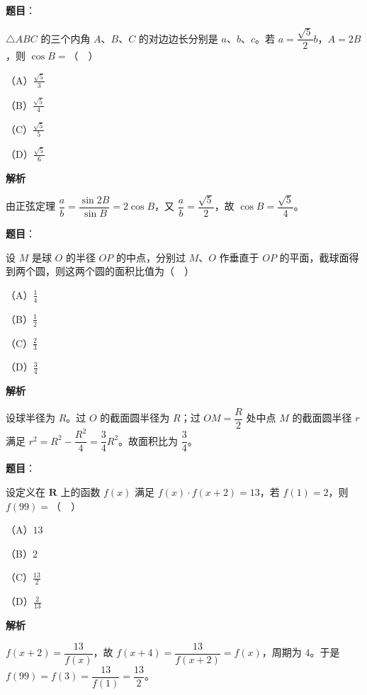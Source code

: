 \begin{answer}

\textbf{题目}：

$\triangle ABC$ 的三个内角 $A$、$B$、$C$ 的对边边长分别是 $a$、$b$、$c$。若 $a=\dfrac{\sqrt5}2b$，$A=2B$，则 $\cos B=$（　）

（A）$\frac{\sqrt5}3$

（B）$\frac{\sqrt5}4$

（C）$\frac{\sqrt5}5$

（D）$\frac{\sqrt5}6$

\textbf{解析}

由正弦定理 $\dfrac ab=\dfrac{\sin2B}{\sin B}=2\cos B$，又 $\dfrac ab=\dfrac{\sqrt5}2$，故 $\cos B=\dfrac{\sqrt5}4$。


\end{answer}
\begin{answer}

\textbf{题目}：

设 $M$ 是球 $O$ 的半径 $OP$ 的中点，分别过 $M$、$O$ 作垂直于 $OP$ 的平面，截球面得到两个圆，则这两个圆的面积比值为（　）

（A）$\frac14$

（B）$\frac12$

（C）$\frac23$

（D）$\frac34$

\textbf{解析}

设球半径为 $R$。过 $O$ 的截面圆半径为 $R$；过 $OM=\dfrac R2$ 处中点 $M$ 的截面圆半径 $r$ 满足 $r^2=R^2-\dfrac{R^2}4=\dfrac34R^2$。故面积比为 $\dfrac34$。


\end{answer}
\begin{answer}

\textbf{题目}：

设定义在 $\mathbf R$ 上的函数 $f(x)$ 满足 $f(x)\cdot f(x+2)=13$，若 $f(1)=2$，则 $f(99)=$（　）

（A）$13$

（B）$2$

（C）$\frac{13}2$

（D）$\frac2{13}$

\textbf{解析}

$f(x+2)=\dfrac{13}{f(x)}$，故 $f(x+4)=\dfrac{13}{f(x+2)}=f(x)$，周期为 $4$。于是 $f(99)=f(3)=\dfrac{13}{f(1)}=\dfrac{13}2$。


\end{answer}
